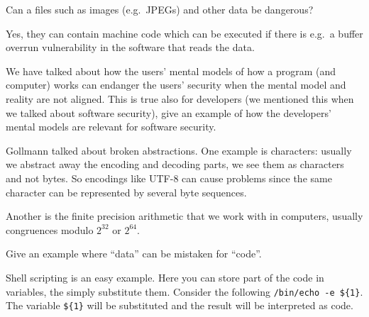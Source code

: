 \question[3]\label{q:software}
Can a files such as images (e.g.\ JPEGs) and other data be dangerous?

\begin{solution}
  Yes, they can contain machine code which can be executed if there is e.g.\ 
  a buffer overrun vulnerability in the software that reads the data.
\end{solution}


\question[3]\label{q:software}
We have talked about how the users' mental models of how a program (and 
computer) works can endanger the users' security when the mental model and 
reality are not aligned.
This is true also for developers (we mentioned this when we talked about 
software security), give an example of how the developers' mental models are 
relevant for software security.

\begin{solution}
  Gollmann talked about broken abstractions.
  One example is characters: usually we abstract away the encoding and decoding 
  parts, we see them as characters and not bytes.
  So encodings like UTF-8 can cause problems since the same character can be 
  represented by several byte sequences.

  Another is the finite precision arithmetic that we work with in computers, 
  usually congruences modulo \(2^{32}\) or \(2^{64}\).
\end{solution}


\question[3]\label{q:software}
Give an example where \enquote{data} can be mistaken for \enquote{code}.

\begin{solution}
  Shell scripting is an easy example.
  Here you can store part of the code in variables, the simply substitute them.
  Consider the following \texttt{/bin/echo -e \$\{1\}}.
  The variable \texttt{\$\{1\}} will be substituted and the result will be 
  interpreted as code.
\end{solution}

